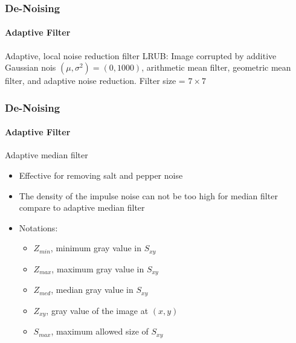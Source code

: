 \documentclass{beamer}
\begin{document}
\begin{frame}
\frametitle{De-Noising}
\framesubtitle{Adaptive Filter}
\begin{block}{Adaptive, local noise reduction filter}
\scriptsize{LRUB: Image corrupted by additive Gaussian nois $(\mu, \sigma^2) = (0, 1000)$, arithmetic mean filter, geometric mean filter, and adaptive noise reduction. Filter size = $7\times 7$ }\\
\end{block}
\end{frame}
\begin{frame}
\frametitle{De-Noising}
\framesubtitle{Adaptive Filter}
\begin{block}{Adaptive median filter}
\begin{itemize}
\item Effective for removing salt and pepper noise 
\item The density of the impulse noise can not be too high for median filter compare to adaptive median filter
\item Notations: 
\begin{itemize}
	\item $Z_{min}$, minimum gray value in $S_{xy}$
	\item $Z_{max}$, maximum gray value in $S_{xy}$
	\item $Z_{med}$, median gray value in $S_{xy}$
	\item $Z_{xy}$, gray value of the image at $(x,y)$
	\item $S_{max}$, maximum allowed size of $S_{xy}$
\end{itemize}
\end{itemize}
\end{block}
\end{frame}
\end{document}
